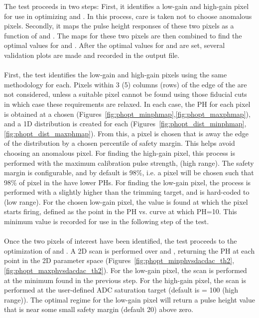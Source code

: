 The \phopt test proceeds in two steps:  
First, it identifies a low-gain and high-gain pixel for use in optimizing \phscale and \phoffset.
In this process, care is taken not to choose anomalous pixels.
Secondly, it maps the pulse height responses of these two pixels as a function of \phscale and \phoffset.
The maps for these two pixels are then combined to find the optimal values for \phscale and \phoffset.
After the optimal values for \phscale and \phoffset are set, several validation plots are made and recorded in the output file.
\\\\
First, the test identifies the low-gain and high-gain pixels using the same methodology for each.
Pixels within 3 (5) columns (rows) of the edge of the \roc are not considered, 
unless a suitable pixel cannot be found using those fiducial cuts in which case these requirements are relaxed.
In each case, the PH for each pixel is obtained at a chosen \vcal (Figures~\ref{fig:phopt_minphmap},\ref{fig:phopt_maxphmap}), 
and a 1D distribution is created for each \roc (Figures~\ref{fig:phopt_dist_minphmap},\ref{fig:phopt_dist_maxphmap}). 
From this, a pixel is chosen that is away the edge of the distribution by a chosen percentile of safety margin.
This helps avoid choosing an anomalous pixel.
For finding the high-gain pixel, this process is performed with the maximum calibration pulse strength,  (high range).
The safety margin is configurable, and by default is 98\%, i.e. a pixel will be chosen such that 98\% of pixel in the \roc have lower PHs.
For finding the low-gain pixel, the process is performed with a \vcal slightly higher than the \vcal trimming target, 
and is hard-coded to  (low range).
For the chosen low-gain pixel, the \vcal value is found at which the pixel starts firing, 
defined as the point in the PH vs. \vcal curve at which PH=10.
This minimum \vcal value is recorded for use in the following step of the test.
\\\\
Once the two pixels of interest have been identified, the test proceeds to the optimization of \phscale and \phoffset.
A 2D scan is performed over \phscale and \phoffset, returning the PH at each point in the 2D parameter space
(Figures~\ref{fig:phopt_minphvsdacdac_th2},\ref{fig:phopt_maxphvsdacdac_th2}).
For the low-gain pixel, the scan is performed at the minimum \vcal found in the previous step.
For the high-gain pixel, the scan is performed at the user-defined ADC saturation target (default is \vcal = 100 (high range)).
The optimal regime for the low-gain pixel will return a pulse height value that is near some small safety margin (default 20) above zero.
